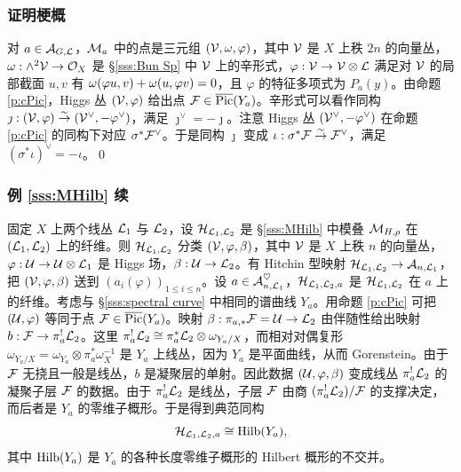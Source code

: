 \subsubsection{证明梗概}
对 $a\in\mathcal{A}_{G,\mathcal{L}}$，$\mathcal{M}_{a}$ 中的点是三元组 $(\mathcal{V},\omega, \varphi)$，其中 $\mathcal{V}$ 是 $X$ 上秩 $2n$ 的向量丛，$\omega: \wedge^{2}\mathcal{V}\to\mathcal{O}_{X}$ 是 \S\ref{sss:Bun Sp} 中 $\mathcal{V}$ 上的辛形式，$\varphi:\mathcal{V}\to\mathcal{V}\otimes\mathcal{L}$ 满足对 $\mathcal{V}$ 的局部截面 $u,v$ 有 $\omega(\varphi u, v)+\omega(u, \varphi v)=0$，且 $\varphi$ 的特征多项式为 $P_{a}(y)$。由命题 \ref{p:cPic}，Higgs 丛 $(\mathcal{V},\varphi)$ 给出点 $\mathcal{F}\in\overline{\textup{Pic}}(Y_{a})$。辛形式可以看作同构 $\jmath: (\mathcal{V},\varphi)\stackrel{\sim}{\to} (\mathcal{V}^{\vee}, -\varphi^{\vee})$，满足 $\jmath^{\vee}=-\jmath$。注意 Higgs 丛 $(\mathcal{V}^{\vee}, -\varphi^{\vee})$ 在命题 \ref{p:cPic} 的同构下对应 $\sigma^{*}\mathcal{F}^{\vee}$。于是同构 $\jmath$ 变成 $\iota:  \sigma^{*}\mathcal{F}\stackrel{\sim}{\to}\mathcal{F}^{\vee}$，满足 $(\sigma^{*}\iota)^{\vee}=-\iota$。\qed

\subsubsection{例 \ref{sss:MHilb} 续}\label{sss:Hilb}
固定 $X$ 上两个线丛 $\mathcal{L}_{1}$ 与 $\mathcal{L}_{2}$，设 $\mathcal{H}_{\mathcal{L}_{1},\mathcal{L}_{2}}$ 是 \S\ref{sss:MHilb} 中模叠 $\mathcal{M}_{H,\rho}$ 在 $(\mathcal{L}_{1},\mathcal{L}_{2})$ 上的纤维。则 $\mathcal{H}_{\mathcal{L}_{1},\mathcal{L}_{2}}$ 分类 $(\mathcal{V},\varphi,\beta)$，其中 $\mathcal{V}$ 是 $X$ 上秩 $n$ 的向量丛，$\varphi:\mathcal{U}\to\mathcal{U}\otimes\mathcal{L}_{1}$ 是 Higgs 场，$\beta: \mathcal{U}\to \mathcal{L}_{2}$。有 Hitchin 型映射 $\mathcal{H}_{\mathcal{L}_{1},\mathcal{L}_{2}}\to\mathcal{A}_{n,\mathcal{L}_{1}}$，把 $(\mathcal{V},\varphi,\beta)$ 送到 $(a_{i}(\varphi))_{1\leq i\leq n}$。设 $a\in\mathcal{A}^{\heartsuit}_{n,\mathcal{L}_{1}}$，$\mathcal{H}_{\mathcal{L}_{1},\mathcal{L}_{2},a}$ 是 $\mathcal{H}_{\mathcal{L}_{1},\mathcal{L}_{2}}$ 在 $a$ 上的纤维。考虑与 \S\ref{sss:spectral curve} 中相同的谱曲线 $Y_{a}$。用命题 \ref{p:cPic} 可把 $(\mathcal{U},\varphi)$ 等同于点 $\mathcal{F}\in\overline{\textup{Pic}}(Y_{a})$。映射 $\beta:\pi_{a,*}\mathcal{F}=\mathcal{U}\to\mathcal{L}_{2}$ 由伴随性给出映射 $b:\mathcal{F}\to \pi^{!}_{a}\mathcal{L}_{2}$。这里 $\pi^{!}_{a}\mathcal{L}_{2}\cong\pi^{*}_{a}\mathcal{L}_{2}\otimes\omega_{Y_{a}/X}$，而相对对偶复形 $\omega_{Y_{a}/X}=\omega_{Y_{a}}\otimes\pi_{a}^{*}\omega_{X}^{-1}$ 是 $Y_{a}$ 上线丛，因为 $Y_{a}$ 是平面曲线，从而 Gorenstein。由于 $\mathcal{F}$ 无挠且一般是线丛，$b$ 是凝聚层的单射。因此数据 $(\mathcal{U},\varphi,\beta)$ 变成线丛 $\pi^{!}_{a}\mathcal{L}_{2}$ 的凝聚子层 $\mathcal{F}$ 的数据。由于 $\pi^{!}_{a}\mathcal{L}_{2}$ 是线丛，子层 $\mathcal{F}$ 由商 $(\pi^{!}_{a}\mathcal{L}_{2})/\mathcal{F}$ 的支撑决定，而后者是 $Y_{a}$ 的零维子概形。于是得到典范同构
\begin{equation*}
\mathcal{H}_{\mathcal{L}_{1},\mathcal{L}_{2},a}\cong\textup{Hilb}(Y_{a}),
\end{equation*}
其中 $\textup{Hilb}(Y_{a})$ 是 $Y_{a}$ 的各种长度零维子概形的 Hilbert 概形的不交并。

